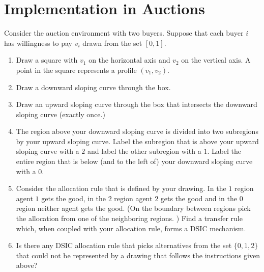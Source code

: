 \documentclass{article}
\newcommand{\enterProblemHeader}[1]{
\nobreak\extramarks{#1}{#1 continued on next page\ldots}\nobreak
\nobreak\extramarks{#1 (continued)}{#1 continued on next page\ldots}\nobreak
}
\newcommand{\exitProblemHeader}[1]{
\nobreak\extramarks{#1 (continued)}{#1 continued on next page\ldots}\nobreak
\nobreak\extramarks{#1}{}\nobreak
}
\newcounter{homeworkProblemCounter} %
\newcommand{\homeworkProblemName}{}
\newenvironment{ex}[1][Problem \arabic{homeworkProblemCounter}]{ %
\stepcounter{homeworkProblemCounter} %
\renewcommand{\homeworkProblemName}{#1} %
\section{\homeworkProblemName} %
}{
}
\newif\ifsolutions
\begin{document}
\begin{ex}[Implementation in Auctions]
	Consider the auction environment with two buyers.  Suppose that each buyer $i$ has willingness to pay
	$v_i$ drawn from the set $[0,1].$
	\begin{enumerate}
		\item Draw a square with $v_1$ on the horizontal axis and $v_2$ on the vertical axis.  A point in the square
		represents a profile $(v_1, v_2)$.
		\item Draw a downward sloping curve through the box.
		\item Draw an upward sloping curve through the box that intersects the downward sloping curve (exactly once.)
		\item The region above your downward sloping curve is divided into two subregions by your upward sloping curve.  Label
		the subregion that is above your upward sloping curve with a $2$ and label the other subregion with a $1$.  Label
		the entire region that is below (and to the left of) your downward sloping curve with a $0$.
		\item Consider the allocation rule that is defined by your drawing.  In the $1$ region agent $1$ gets the
		good, in the $2$ region agent $2$ gets the good and in the $0$ region neither agent gets the good.  (On the boundary
		between regions pick the allocation from one of the neighboring regions. )  Find a transfer rule which, when
		coupled with your allocation rule, forms a DSIC mechanism.
		\item Is there any DSIC allocation rule that picks alternatives from the set $\{0,1,2\}$ that could not be represented
		by a drawing that follows the instructions given above?
	\end{enumerate}
	
	\ifsolutions

\end{ex}
\end{document}
